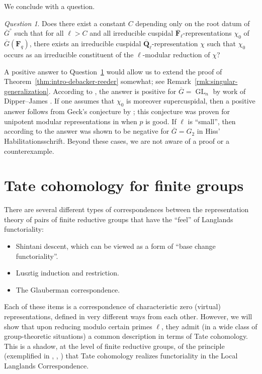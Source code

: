 \documentclass[reqno]{amsart}
\numberwithin{equation}{subsection}
\newcommand{\F}{\mathbf{F}}
\newcommand{\Q}{\mathbf{Q}}
\newcommand{\ol}[1]{\overline{#1}}
\DeclareMathOperator{\GL}{GL}
\theoremstyle{remark}
\newtheorem{question}[thm]{Question}
\numberwithin{equation}{subsection}
\numberwithin{figure}{subsection}
\begin{document}
We conclude with a question.

\begin{question}\label{question:cuspidal-lifting}
    Does there exist a constant $C$ depending only on the root datum of $\ol G^\circ$ such that for all $\ell > C$ and all irreducible cuspidal $\ol\F_\ell$-representations $\chi_0$ of $\ol G(\F_q)$, there exists an irreducible cuspidal $\ol\Q_\ell$-representation $\chi$ such that $\chi_0$ occurs as an irreducible constituent of the $\ell$-modular reduction of $\chi$?
\end{question}

A positive answer to Question~\ref{question:cuspidal-lifting} would allow us to extend the proof of Theorem~\ref{thm:intro-debacker-reeder} somewhat; see Remark~\ref{rmk:singular-generalization}. According to \cite[Theorem~7.8]{GHM94}, the answer is positive for $\ol G = \GL_n$ by work of Dipper--James \cite{DJ86}. If one assumes that $\chi_0$ is moreover supercuspidal, then a positive answer follows from Geck's conjecture \cite[(6.6)]{Geck92} by \cite[Proposition~3.3]{Hiss96}; this conjecture was proven for unipotent modular representations in \cite{DuM18} when $p$ is good. If $\ell$ is ``small'', then according to \cite[Introduction]{GHM94} the answer was shown to be negative for $\ol G = G_2$ in Hiss' Habilitationsschrift. Beyond these cases, we are not aware of a proof or a counterexample.
















\section{Tate cohomology for finite groups}\label{section:rosetta-stone}

There are several different types of correspondences between the representation theory of pairs of finite reductive groups that have the ``feel'' of Langlands functoriality: 
\begin{itemize}
    \item Shintani descent, which can be viewed as a form of ``base change functoriality''. 
    \item Lusztig induction and restriction.
    \item The Glauberman correspondence.
\end{itemize}
Each of these items is a correspondence of characteristic zero (virtual) representations, defined in very different ways from each other. However, we will show that upon reducing modulo certain primes $\ell$, they admit (in a wide class of group-theoretic situations) a common description in terms of Tate cohomology. This is a shadow, at the level of finite reductive groups, of the principle (exemplified in \cite{TV}, \cite{Fe23}, \cite{F24}) that Tate cohomology realizes functoriality in the Local Langlands Correspondence.
\end{document}
